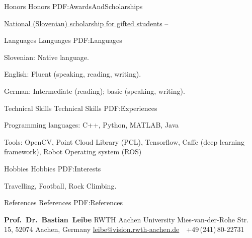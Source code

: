 \documentclass[letterpaper,MMMyyyy,nonstopmode]{simpleresumecv}
\newcommand{\CVNote}{CV compiled on {\today}}
\begin{document}
\begin{Body}
\endgroup


\Section
{Honors}
{Honors}
{PDF:AwardsAndScholarships}

\Gap
\BulletItem
\href{http://www.sklad-kadri.si/en/scholarships/zois-scholarships/}{National (Slovenian) scholarship for gifted students}
\hfill
{} --
\newline


\Section
{Languages}
{Languages}
{PDF:Languages}

\BulletItem
Slovenian: Native language.

\Gap
\BulletItem
English: Fluent (speaking, reading, writing).

\Gap
\BulletItem
German: Intermediate (reading); basic (speaking, writing).


\Section
{Technical Skills}
{Technical Skills}
{PDF:Experiences}

\BulletItem Programming languages:
C++,
Python,
MATLAB,
Java

\BulletItem Tools:
OpenCV,
Point Cloud Library (PCL),
Tensorflow,
Caffe (deep learning framework),
Robot Operating system (ROS)


\Section
{Hobbies}
{Hobbies}
{PDF:Interests}

\Entry
Travelling,
Football,
Rock Climbing.


\Section
{References}
{References}
{PDF:References}

\BulletItem
\textbf{Prof.~Dr.~Bastian~Leibe}
\newline
RWTH Aachen University
\newline
Mies-van-der-Rohe Str. 15, 52074 Aachen, Germany
\newline
\href{mailto:leibe@vision.rwth-aachen.de}
{leibe@vision.rwth-aachen.de}
\,\SubBulletSymbol\,
+49\,(241)\,80-22731

\end{Body}


\end{document}
